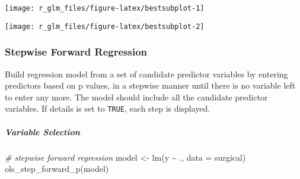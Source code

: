 \documentclass[
]{article}
\newenvironment{Shaded}{\begin{snugshade}}{\end{snugshade}}
\newcommand{\AttributeTok}[1]{\textcolor[rgb]{0.77,0.63,0.00}{#1}}
\newcommand{\CommentTok}[1]{\textcolor[rgb]{0.56,0.35,0.01}{\textit{#1}}}
\newcommand{\FunctionTok}[1]{\textcolor[rgb]{0.00,0.00,0.00}{#1}}
\newcommand{\NormalTok}[1]{#1}
\newcommand{\OtherTok}[1]{\textcolor[rgb]{0.56,0.35,0.01}{#1}}
\newcommand{\SpecialCharTok}[1]{\textcolor[rgb]{0.00,0.00,0.00}{#1}}
\begin{document}
\begin{center}\texttt{[image: r\_glm\_files/figure-latex/bestsubplot-1]} \end{center}

\begin{center}\texttt{[image: r\_glm\_files/figure-latex/bestsubplot-2]} \end{center}

\hypertarget{stepwise-forward-regression}{%
\subsubsection{Stepwise Forward
Regression}\label{stepwise-forward-regression}}

Build regression model from a set of candidate predictor variables by
entering predictors based on p values, in a stepwise manner until there
is no variable left to enter any more. The model should include all the
candidate predictor variables. If details is set to \texttt{TRUE}, each
step is displayed.

\hypertarget{variable-selection-1}{%
\subparagraph{Variable Selection}\label{variable-selection-1}}

\begin{Shaded}
\begin{Highlighting}[]
\CommentTok{\# stepwise forward regression}
\NormalTok{model }\OtherTok{\textless{}{-}} \FunctionTok{lm}\NormalTok{(y }\SpecialCharTok{\textasciitilde{}}\NormalTok{ ., }\AttributeTok{data =}\NormalTok{ surgical)}
\FunctionTok{ols\_step\_forward\_p}\NormalTok{(model)}
\end{Highlighting}
\end{Shaded}
\end{document}
